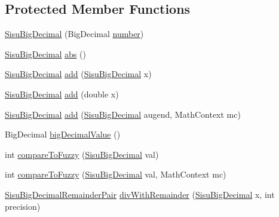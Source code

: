 \subsection*{Protected Member Functions}
\begin{DoxyCompactItemize}
\item 
\hyperlink{classcom_1_1aarrelaakso_1_1drawl_1_1_sisu_big_decimal_a2073791c3fc4e6d6cbbd9a6e7b83e295}{Sisu\+Big\+Decimal} (Big\+Decimal \hyperlink{classcom_1_1aarrelaakso_1_1drawl_1_1_sisu_big_decimal_af27e00f82037e4c3658558cd6c81af06}{number})
\item 
\hyperlink{classcom_1_1aarrelaakso_1_1drawl_1_1_sisu_big_decimal}{Sisu\+Big\+Decimal} \hyperlink{classcom_1_1aarrelaakso_1_1drawl_1_1_sisu_big_decimal_a7b9d58fa45206483a9ca603c118d7fae}{abs} ()
\item 
\hyperlink{classcom_1_1aarrelaakso_1_1drawl_1_1_sisu_big_decimal}{Sisu\+Big\+Decimal} \hyperlink{classcom_1_1aarrelaakso_1_1drawl_1_1_sisu_big_decimal_aed9db04cdf1516cc87d0599b99fb6b02}{add} (\hyperlink{classcom_1_1aarrelaakso_1_1drawl_1_1_sisu_big_decimal}{Sisu\+Big\+Decimal} x)
\item 
\hyperlink{classcom_1_1aarrelaakso_1_1drawl_1_1_sisu_big_decimal}{Sisu\+Big\+Decimal} \hyperlink{classcom_1_1aarrelaakso_1_1drawl_1_1_sisu_big_decimal_a20a8c4842d23a2a5394eed4bc7d19251}{add} (double x)
\item 
\hyperlink{classcom_1_1aarrelaakso_1_1drawl_1_1_sisu_big_decimal}{Sisu\+Big\+Decimal} \hyperlink{classcom_1_1aarrelaakso_1_1drawl_1_1_sisu_big_decimal_ac90515f60f6f93b09d76ea389ffe689a}{add} (\hyperlink{classcom_1_1aarrelaakso_1_1drawl_1_1_sisu_big_decimal}{Sisu\+Big\+Decimal} augend, Math\+Context mc)
\item 
Big\+Decimal \hyperlink{classcom_1_1aarrelaakso_1_1drawl_1_1_sisu_big_decimal_a48686473be6df9038c67d2cefa26c311}{big\+Decimal\+Value} ()
\item 
int \hyperlink{classcom_1_1aarrelaakso_1_1drawl_1_1_sisu_big_decimal_a9a7c6100961355b8acb1dbcb40197136}{compare\+To\+Fuzzy} (\hyperlink{classcom_1_1aarrelaakso_1_1drawl_1_1_sisu_big_decimal}{Sisu\+Big\+Decimal} val)
\item 
int \hyperlink{classcom_1_1aarrelaakso_1_1drawl_1_1_sisu_big_decimal_a2914bed4a69adb928d6edb2af9d578d4}{compare\+To\+Fuzzy} (\hyperlink{classcom_1_1aarrelaakso_1_1drawl_1_1_sisu_big_decimal}{Sisu\+Big\+Decimal} val, Math\+Context mc)
\item 
\hyperlink{classcom_1_1aarrelaakso_1_1drawl_1_1_sisu_big_decimal_remainder_pair}{Sisu\+Big\+Decimal\+Remainder\+Pair} \hyperlink{classcom_1_1aarrelaakso_1_1drawl_1_1_sisu_big_decimal_a21e09234efca516798b5bd745fccad41}{div\+With\+Remainder} (\hyperlink{classcom_1_1aarrelaakso_1_1drawl_1_1_sisu_big_decimal}{Sisu\+Big\+Decimal} x, int precision)

\end{DoxyCompactItemize}
